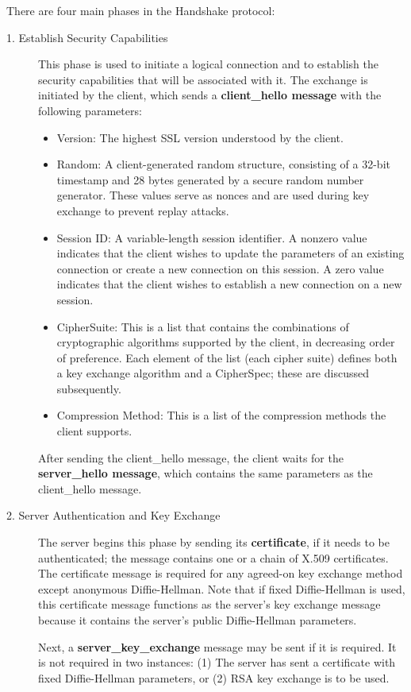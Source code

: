 \documentclass[12pt]{article}
\begin{document}
There are four main phases in the Handshake protocol:
\begin{description}
\item[1. Establish Security Capabilities]
This phase is used to initiate a logical connection and to establish the security capabilities that will be associated with it. The exchange is initiated by the client, which sends a\textbf{ client\_hello message} with the following parameters: 
\begin{itemize}
\item Version: The highest SSL version understood by the client.
\item Random: A client-generated random structure, consisting of a 32-bit timestamp and 28 bytes generated by a secure random number generator. These values serve as nonces and are used
during key exchange to prevent replay attacks.
\item Session ID: A variable-length session identifier. A nonzero value indicates that the client wishes
to update the parameters of an existing connection or create a new connection on this session. A zero value indicates that the client wishes to establish a new connection on a new session.
\item CipherSuite: This is a list that contains the combinations of cryptographic algorithms supported
by the client, in decreasing order of preference. Each element of the list (each cipher suite)
defines both a key exchange algorithm and a CipherSpec; these are discussed subsequently.
\item Compression Method: This is a list of the compression methods the client supports.
\end{itemize}
After sending the client\_hello message, the client waits for the \textbf{server\_hello message}, which contains the same parameters as the client\_hello message.
\item[2. Server Authentication and Key Exchange]
The server begins this phase by sending its \textbf{certificate}, if it needs to be authenticated; the message contains one or a chain of X.509 certificates. The certificate message is required for any agreed-on key exchange method except anonymous Diffie-Hellman. Note that if fixed Diffie-Hellman is used, this certificate message functions as the server's key exchange message because it contains the server's public Diffie-Hellman parameters.

Next, a \textbf{server\_key\_exchange} message may be sent if it is required. It is not required in two instances: (1) The server has sent a certificate with fixed Diffie-Hellman parameters, or (2) RSA key exchange is to be used. 


\end{description}
\end{document}
